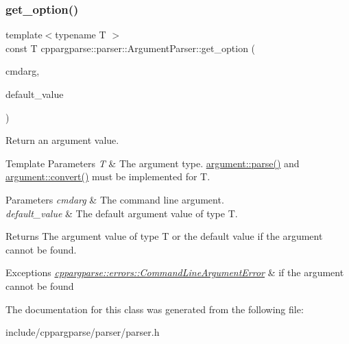 \subsubsection{\texorpdfstring{get\+\_\+option()}{get\_option()}\hspace{0.1cm}{\footnotesize\ttfamily [2/2]}}
{\footnotesize\ttfamily template$<$typename T $>$ \\
const T cppargparse\+::parser\+::\+Argument\+Parser\+::get\+\_\+option (\begin{DoxyParamCaption}\item[{const \hyperlink{structcppargparse_1_1types_1_1CommandLineArgument__t}{types\+::\+Command\+Line\+Argument\+\_\+t} \&}]{cmdarg,  }\item[{const T \&}]{default\+\_\+value }\end{DoxyParamCaption})\hspace{0.3cm}{\ttfamily [inline]}}



Return an argument value. 


\begin{DoxyTemplParams}{Template Parameters}
{\em T} & The argument type. \hyperlink{structcppargparse_1_1argument_a9b5feac6fe8cf18beb63d85c0840cd84}{argument\+::parse()} and \hyperlink{structcppargparse_1_1argument_a2051f71ef4ed0b9d299cc58bb494e42b}{argument\+::convert()} must be implemented for T.\\
\hline
\end{DoxyTemplParams}

\begin{DoxyParams}{Parameters}
{\em cmdarg} & The command line argument. \\
\hline
{\em default\+\_\+value} & The default argument value of type T.\\
\hline
\end{DoxyParams}
\begin{DoxyReturn}{Returns}
The argument value of type T or the default value if the argument cannot be found. 
\end{DoxyReturn}

\begin{DoxyExceptions}{Exceptions}
{\em \hyperlink{classcppargparse_1_1errors_1_1CommandLineArgumentError}{cppargparse\+::errors\+::\+Command\+Line\+Argument\+Error}} & if the argument cannot be found \\
\hline
\end{DoxyExceptions}


The documentation for this class was generated from the following file\+:\begin{DoxyCompactItemize}
\item 
include/cppargparse/parser/parser.\+h\end{DoxyCompactItemize}
